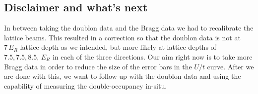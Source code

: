 \documentclass[11pt,letter]{article}
\begin{document}
 
 
\subsection{Disclaimer and what's next}
\label{sec:disclaimer}

In between taking the doublon data and the Bragg data we had to recalibrate the
lattice beams.  This resulted in a correction so that the doublon data is not
at $7\,E_{R}$ lattice depth  as we intended, but more likely at lattice depths
of $7.5, 7.5, 8.5,\,E_{R}$ in each of the three directions.   Our aim right now
is to take more Bragg data in order to reduce the size of the error bars in the
$U/t$ curve.   After we are done with this, we want to follow up with the
doublon data and using the capability of measuring the double-occupancy
in-situ. 




 



\end{document}
